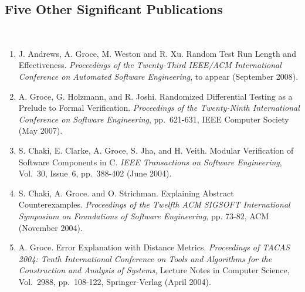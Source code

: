 \documentclass[fleqn,11pt]{article}
\newcommand{\sht}{\vspace{-.24in}}
\renewcommand{\$}[1]{$#1$}
\begin{document}
\subsection*{Five Other Significant Publications}\
\begin{enumerate}
\item
J. Andrews, A. Groce, M. Weston and R. Xu.  Random Test Run Length and Effectiveness.  {\em Proceedings of the Twenty-Third IEEE/ACM International Conference on Automated Software Engineering}, to appear (September 2008).
\item A. Groce, G. Holzmann, and R. Joshi.  Randomized Differential Testing as a Prelude to Formal Verification.  {\em Proceedings of the Twenty-Ninth International Conference on Software Engineering}, pp.~621-631, IEEE Computer Society (May 2007).
\item S. Chaki, E. Clarke, A. Groce, S. Jha, and H. Veith.  Modular Verification of Software Components in C.  {\em IEEE Transactions on Software Engineering}, Vol.~30, Issue~6, pp.~388-402 (June 2004).
\item S. Chaki, A. Groce. and O. Strichman.  Explaining Abstract Counterexamples.  {\em Proceedings of the Twelfth ACM SIGSOFT International Symposium on Foundations of Software Engineering}, pp. 73-82, ACM (November 2004).
\item A. Groce.  Error Explanation with Distance Metrics. {\em Proceedings of TACAS 2004: Tenth International Conference on
Tools and Algorithms for the Construction and Analysis of Systems},
Lecture Notes in Computer Science, Vol.~2988, pp.~108-122, Springer-Verlag
(April 2004).
\end{enumerate}
\end{document}
